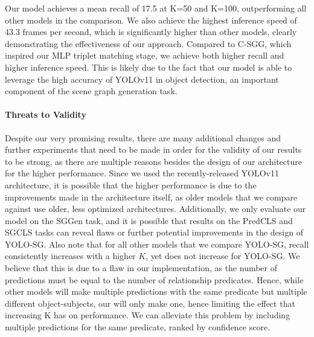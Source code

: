 \documentclass{article}
\begin{document}
Our model achieves a mean recall of 17.5 at K=50 and K=100, outperforming all other models in the comparison. We also achieve the highest inference speed of 43.3 frames per second, which is significantly higher than other models, clearly demonstrating the effectiveness of our approach. Compared to C-SGG\cite{jin2023fast}, which inspired our MLP triplet matching stage, we achieve both higher recall and higher inference speed. This is likely due to the fact that our model is able to leverage the high accuracy of YOLOv11 in object detection, an important component of the scene graph generation task. 
\paragraph{Threats to Validity}
Despite our very promising results, there are many additional changes and further experiments that need to be made in order for the validity of our results to be strong, as there are multiple reasons besides the design of our architecture for the higher performance.
Since we used the recently-released YOLOv11 architecture, it is possible that the higher performance is due to the improvements made in the architecture itself, as older models that we compare against use older, less optimized architectures. Additionally, we only evaluate our model on the SGGen task, and it is possible that results on the PredCLS and SGCLS tasks can reveal flaws or further potential improvements in the design of YOLO-SG.
Also note that for all other models that we compare YOLO-SG, recall consistently increases with a higher $K$, yet does not increase for YOLO-SG. We believe that this is due to a flaw in our implementation, as the number of predictions must be equal to the number of relationship predicates.
Hence, while other models will make multiple predictions with the same predicate but multiple different object-subjects, our will only make one, hence limiting the effect that increasing K has on performance. We can alleviate this problem by including multiple predictions for the same predicate, ranked by confidence score. 
\end{document}
